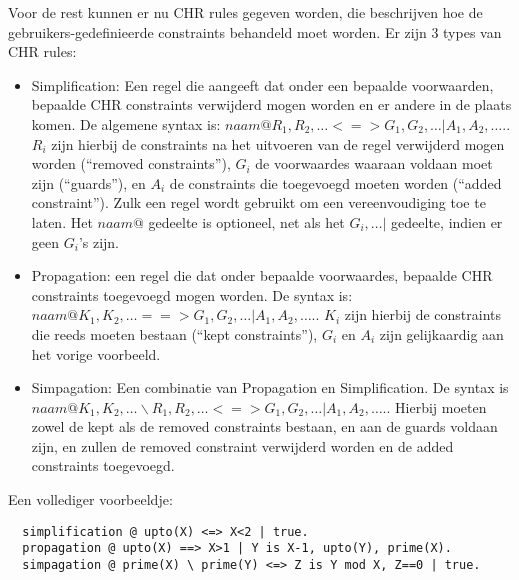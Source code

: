 Voor de rest kunnen er nu CHR rules gegeven worden, die beschrijven hoe de gebruikers-gedefinieerde constraints  behandeld moet worden. Er zijn 3 types van CHR rules: \begin{itemize}
\item Simplification: Een regel die aangeeft dat onder een bepaalde voorwaarden, bepaalde CHR constraints verwijderd mogen worden en er andere in de plaats komen. De algemene syntax is:  $naam @ R_1, R_2, \ldots <=> G_1, G_2, \ldots | A_1, A_2, \ldots.$. $R_i$ zijn hierbij de constraints na het uitvoeren van de regel verwijderd mogen worden (``removed constraints''), $G_i$ de voorwaardes waaraan voldaan moet zijn (``guards''), en $A_i$ de constraints die toegevoegd moeten worden (``added constraint''). Zulk een regel wordt gebruikt om een vereenvoudiging toe te laten. Het $naam @$ gedeelte is optioneel, net als het $G_i, \ldots |$ gedeelte, indien er geen $G_i$'s zijn.
\item Propagation: een regel die dat onder bepaalde voorwaardes, bepaalde CHR constraints toegevoegd mogen worden. De syntax is: $naam @ K_1, K_2, \ldots ==> G_1, G_2, \ldots | A_1, A_2, \ldots.$. $K_i$ zijn hierbij de constraints die reeds moeten bestaan (``kept constraints''), $G_i$ en $A_i$ zijn gelijkaardig aan het vorige voorbeeld.
\item Simpagation: Een combinatie van Propagation en Simplification. De syntax is $naam @ K_1, K_2, \ldots \backslash R_1, R_2, \ldots <=> G_1, G_2, \ldots | A_1, A_2, \ldots.$. Hierbij moeten zowel de kept als de removed constraints bestaan, en aan de guards voldaan zijn, en zullen de removed constraint verwijderd worden en de added constraints toegevoegd.
\end{itemize}

Een vollediger voorbeeldje:
\begin{Verbatim}
  simplification @ upto(X) <=> X<2 | true.
  propagation @ upto(X) ==> X>1 | Y is X-1, upto(Y), prime(X).
  simpagation @ prime(X) \ prime(Y) <=> Z is Y mod X, Z==0 | true.
\end{Verbatim}

